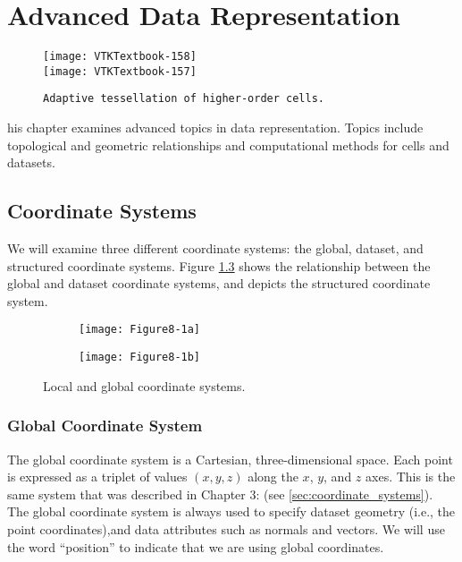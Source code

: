 \chapter{Advanced Data Representation}
\label{chap:advanced_data_representation}

\begin{figure}[ht]
    \hfill
    \begin{minipage}{0.5\textwidth}
        \centering
        \texttt{[image: VTKTextbook-158]}\\
        \texttt{[image: VTKTextbook-157]}
        \caption*{\texttt{Adaptive tessellation of higher-order cells.}}
    \end{minipage}
\end{figure}


his chapter examines advanced topics in data representation.
Topics include topological and geometric relationships and computational methods for cells and datasets.

\section{Coordinate Systems}
We will examine three different coordinate systems: the global, dataset, and structured coordinate systems.
Figure \ref{fig:Figure8-1} shows the relationship between the global and dataset coordinate systems, and depicts the structured coordinate system.

\begin{figure}[!htb]
    \centering
    \begin{subfigure}{0.48\linewidth}
        \centering
        \texttt{[image: Figure8-1a]}
        \caption*{}\label{fig:Figure8-1a}
    \end{subfigure}
    \hfill
    \begin{subfigure}{0.48\linewidth}
        \centering
        \texttt{[image: Figure8-1b]}
        \caption*{}\label{fig:Figure8-1b}
    \end{subfigure}%
    \caption{Local and global coordinate systems.}
    \label{fig:Figure8-1}
\end{figure}


\subsection{Global Coordinate System}
The global coordinate system is a Cartesian, three-dimensional space. Each point is expressed as a triplet of values $(x,y,z)$ along the $x$, $y$, and $z$ axes.
This is the same system that was described in Chapter 3:  (see \ref{sec:coordinate_systems}).
The global coordinate system is always used to specify dataset geometry (i.e., the point coordinates),and data attributes such as normals and vectors.
We will use the word ``position'' to indicate that we are using global coordinates.

